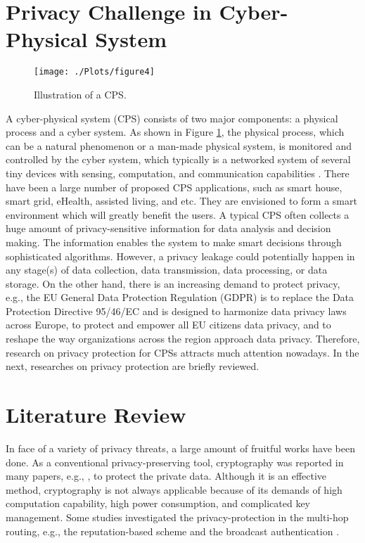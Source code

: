 \documentclass[g5paper,phd,electronic]{kthesis}
\numberwithin{theorem}{chapter}
\numberwithin{lemma}{chapter}
\numberwithin{proposition}{chapter}
\numberwithin{corollary}{chapter}
\numberwithin{remark}{chapter}
\numberwithin{property}{chapter}
\numberwithin{conjecture}{chapter}
\numberwithin{assumption}{chapter}
\numberwithin{algorithm}{chapter}
\begin{document}
\section{Privacy Challenge in Cyber-Physical System}
\label{section1.1}
\begin{figure}[h]
\center
\texttt{[image: ./Plots/figure4]}
\caption{Illustration of a CPS.}
\label{figure1.1}
\end{figure}
A cyber-physical system (CPS) consists of two major components: a physical process and a cyber system. As shown in Figure \ref{figure1.1}, the physical process, which can be a natural phenomenon or a man-made physical system, is monitored and controlled by the cyber system, which typically is a networked system of several tiny devices with sensing, computation, and communication capabilities \cite{eric2010}. There have been a large number of proposed CPS applications, such as smart house, smart grid, eHealth, assisted living, and etc. They are envisioned to form a smart environment which will greatly benefit the users. A typical CPS often collects a huge amount of privacy-sensitive information for data analysis and decision making. The information enables the system to make smart decisions through sophisticated algorithms. However, a privacy leakage could potentially happen in any stage(s) of data collection, data transmission, data processing, or data storage. On the other hand, there is an increasing demand to protect privacy, e.g., the EU General Data Protection Regulation (GDPR) \cite{gdpr} is to replace the Data Protection Directive 95/46/EC and is designed to harmonize data privacy laws across Europe, to protect and empower all EU citizens data privacy, and to reshape the way organizations across the region approach data privacy. Therefore, research on privacy protection for CPSs attracts much attention nowadays. In the next, researches on privacy protection are briefly reviewed.

\section{Literature Review}
\label{section1.2}
In face of a variety of privacy threats, a large amount of fruitful works have been done. As a conventional privacy-preserving tool, cryptography was reported in many papers, e.g., \cite{stefan2005}, to protect the private data. Although it is an effective method, cryptography is not always applicable because of its demands of high computation capability, high power consumption, and complicated key management. Some studies investigated the privacy-protection in the multi-hop routing, e.g., the reputation-based scheme \cite{cao2006} and the broadcast authentication \cite{liu2005}.
\end{document}
